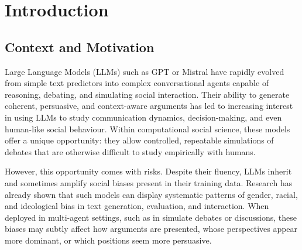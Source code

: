 
\chapter{Introduction}
\label{chap:introduction}

\section{Context and Motivation}

Large Language Models (LLMs) such as GPT  \citep{brown2020language} or Mistral \citep{jiang2023mistral7b} have rapidly evolved from simple text predictors into complex conversational agents capable of reasoning, debating, and simulating social interaction. Their ability to generate coherent, persuasive, and context-aware arguments has led to increasing interest in using LLMs to study communication dynamics, decision-making, and even human-like social behaviour. Within computational social science, these models offer a unique opportunity: they allow controlled, repeatable simulations of debates that are otherwise difficult to study empirically with humans.

However, this opportunity comes with risks. Despite their fluency, LLMs inherit and sometimes amplify social biases present in their training data. Research has already shown that such models can display systematic patterns of gender, racial, and ideological bias in text generation, evaluation, and interaction. When deployed in multi-agent settings, such as in simulate debates or discussions, these biases may subtly affect how arguments are presented, whose perspectives appear more dominant, or which positions seem more persuasive.

